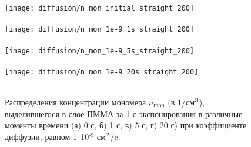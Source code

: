 \begin{figure}[H]
	\begin{center}
		\texttt{[image: diffusion/n\_mon\_initial\_straight\_200]} \\
		\vspace{-4em}  \vspace{2.2em} \\
		\texttt{[image: diffusion/n\_mon\_1e-9\_1s\_straight\_200]} \\
		\vspace{-4em}  \vspace{2.2em} \\
		\texttt{[image: diffusion/n\_mon\_1e-9\_5s\_straight\_200]} \\
		\vspace{-4em}  \vspace{2.2em} \\
		\texttt{[image: diffusion/n\_mon\_1e-9\_20s\_straight\_200]} \\
		\vspace{-4em}  \vspace{2.2em} \\
	\end{center}
	\vspace{-1em}
	\caption{Распределения концентрации мономера $n_\text{mon}$ (в 1/см$^\text{3}$), выделившегося в слое ПММА за 1 с экспонирования в различные моменты времени (а) 0 с, б) 1 с, в) 5 с, г) 20 с) при коэффициенте диффузии, равном 1\:$\cdot$\,10$^\text{-9}$ см$^\text{2}$/c.}
	\label{fig:diffusion_10s}
\end{figure}

